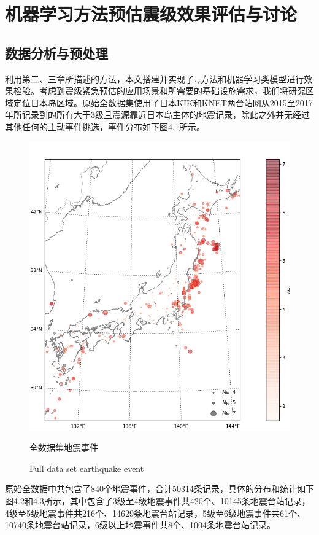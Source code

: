 \chapter{机器学习方法预估震级效果评估与讨论 }
\section{数据分析与预处理}
\indent 利用第二、三章所描述的方法，本文搭建并实现了$\tau_{c}$方法和机器学习类模型进行效果检验。考虑到震级紧急预估的应用场景和所需要的基础设施需求，我们将研究区域定位日本岛区域。原始全数据集使用了日本KIK和KNET两台站网从2015至2017年所记录到的所有大于3级且震源靠近日本岛主体的地震记录，除此之外并无经过其他任何的主动事件挑选，事件分布如下图4.1所示。\\
\begin{figure}[!h] 
\centering 
 \includegraphics[width=0.8\linewidth]{img/basemap.jpg} 
 \renewcommand{\figurename}{图} 
\caption{全数据集地震事件} 
\addtocounter{figure}{-1} \vspace{-5pt} 
\renewcommand{\figurename}{Fig} 
\caption{Full data set earthquake event} 
\renewcommand{\figurename}{图} 
\label{fig:network-device-influence.png} 
\end{figure}
\indent 原始全数据中共包含了840个地震事件，合计50314条记录，具体的分布和统计如下图4.2和4.3所示，其中包含了3级至4级地震事件共420个、10145条地震台站记录，4级至5级地震事件共216个、14629条地震台站记录，5级至6级地震事件共61个、10740条地震台站记录，6级以上地震事件共8个、1004条地震台站记录。\\
